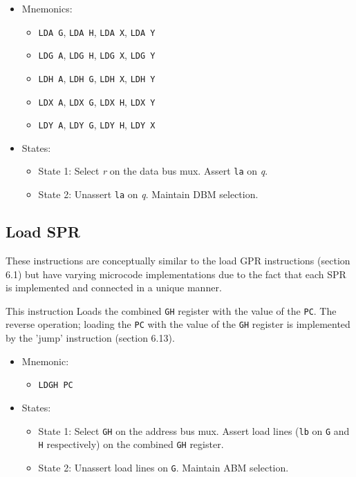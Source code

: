 \documentclass[a4paper,12pt]{article}
\newcommand{\Gr}{\texttt{G}}
\newcommand{\Hr}{\texttt{H}}
\newcommand{\PC}{\texttt{PC}}
\newcommand{\qq}{\textit{q}}
\newcommand\rr{\textit{r}}
\begin{document}
\begin{itemize}
\item Mnemonics:
\begin{itemize}
	\item \texttt{LDA G}, \texttt{LDA H}, \texttt{LDA X}, \texttt{LDA Y}
	\item \texttt{LDG A}, \texttt{LDG H}, \texttt{LDG X}, \texttt{LDG Y}
	\item \texttt{LDH A}, \texttt{LDH G}, \texttt{LDH X}, \texttt{LDH Y}
	\item \texttt{LDX A}, \texttt{LDX G}, \texttt{LDX H}, \texttt{LDX Y}
	\item \texttt{LDY A}, \texttt{LDY G}, \texttt{LDY H}, \texttt{LDY X}
\end{itemize}
\item States:
\begin{itemize}
	\item State 1: Select \rr{} on the data bus mux. Assert \texttt{la} on
	\qq{}.
	\item State 2: Unassert \texttt{la} on \qq{}. Maintain DBM selection.
\end{itemize}
\end{itemize}

\subsection{Load SPR}
These instructions are conceptually similar to the load GPR instructions
(section 6.1) but have varying microcode implementations due to the fact that
each SPR is implemented and connected in a unique manner.
\par

This instruction Loads the combined \Gr{}\Hr{} register with the value of the 
\PC{}. The reverse operation; loading the \PC{} with the value of the 
\Gr{}\Hr{} register is implemented by the 'jump' instruction (section 6.13).
\par

\begin{itemize}
\item Mnemonic:
\begin{itemize}
	\item \texttt{LDGH PC}
\end{itemize}
\item States:
\begin{itemize}
	\item State 1: Select \Gr{}\Hr{} on the address bus mux. Assert load
	lines (\texttt{lb} on \Gr{} and \Hr{} respectively) on the combined 
	\Gr{}\Hr{} register.
	\item State 2: Unassert load lines on \Gr{}. Maintain ABM selection.
\end{itemize}
\end{itemize}
\end{document}
